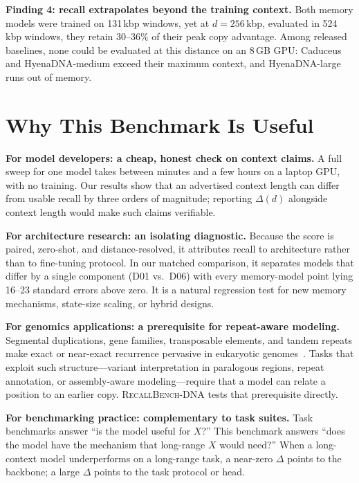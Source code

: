 \textbf{Finding 4: recall extrapolates beyond the training context.} Both memory models were
trained on 131\,kbp windows, yet at $d=256$\,kbp, evaluated in 524\,kbp windows, they retain
$30$--$36\%$ of their peak copy advantage. Among released baselines, none could be
evaluated at this distance on an 8\,GB GPU: Caduceus and HyenaDNA-medium exceed their
maximum context, and HyenaDNA-large runs out of memory.

\section{Why This Benchmark Is Useful}
\label{sec:usefulness}

\textbf{For model developers: a cheap, honest check on context claims.} A full sweep for one
model takes between minutes and a few hours on a laptop GPU, with no training. Our results
show that an advertised context length can differ from usable recall by three orders of
magnitude; reporting $\Delta(d)$ alongside context length would make such claims verifiable.

\textbf{For architecture research: an isolating diagnostic.} Because the score is paired,
zero-shot, and distance-resolved, it attributes recall to architecture rather than to
fine-tuning protocol. In our matched comparison, it separates models that differ by a single
component (D01 vs.\ D06) with every memory-model point lying 16--23 standard errors above zero. It is a natural
regression test for new memory mechanisms, state-size scaling, or hybrid designs.

\textbf{For genomics applications: a prerequisite for repeat-aware modeling.} Segmental
duplications, gene families, transposable elements, and tandem repeats make exact or
near-exact recurrence pervasive in eukaryotic genomes~\cite{dekoning2011repeats}. Tasks that
exploit such structure---variant interpretation in paralogous regions, repeat annotation, or
assembly-aware modeling---require that a model can relate a position to an earlier copy.
\textsc{RecallBench-DNA} tests that prerequisite directly.

\textbf{For benchmarking practice: complementary to task suites.} Task benchmarks answer
``is the model useful for $X$?'' This benchmark answers ``does the model have the mechanism
that long-range $X$ would need?'' When a long-context model underperforms on a long-range
task, a near-zero $\Delta$ points to the backbone; a large $\Delta$ points to the task
protocol or head.


